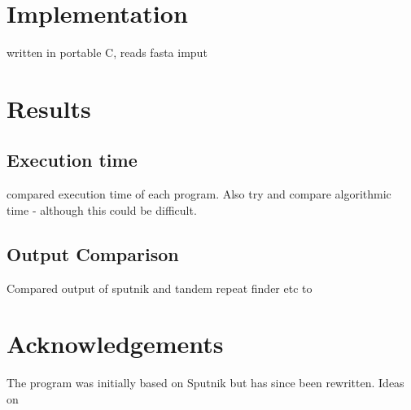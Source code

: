 \documentclass[a4paper]{article}
\begin{document}
\section{Implementation}

written in portable C, reads fasta imput

\section{Results}

\subsection{Execution time}

compared execution time of each program. Also try and compare algorithmic time - although this could be difficult.

\subsection{Output Comparison}

Compared output of sputnik and tandem repeat finder etc to

\section{Acknowledgements}

The program was initially based on Sputnik but has since been rewritten. Ideas on 
\end{document}
